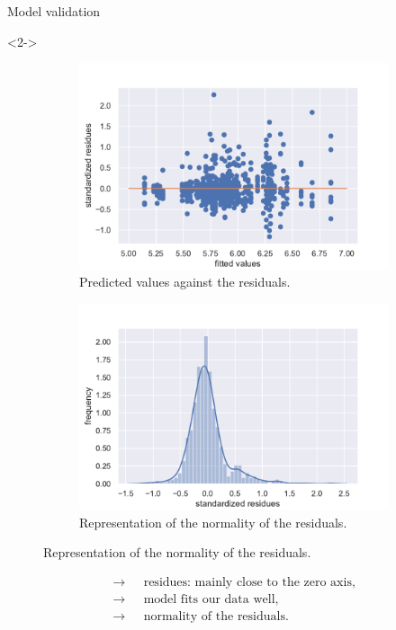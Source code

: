 \documentclass[unknownkeysallowed]{beamer}
\begin{document}
\begin{frame}{Model validation}
\begin{onlyenv}
\begin{figure}[H]
\end{figure}
\end{onlyenv}
\begin{onlyenv}<2->
\begin{figure}[H]
\centering
\begin{subfigure}{.5\textwidth}
  \centering
  \includegraphics[width=1\linewidth]{./images/homo_mod2.pdf}
  \caption{Predicted values against the residuals.}
\end{subfigure}%
\begin{subfigure}{.5\textwidth}
  \centering
  \includegraphics[width=1\linewidth, clip,trim={0cm 0cm 0cm 0cm} ]{./images/resid_norm_m2.pdf}
  \caption{Representation of the normality of the residuals.}
\end{subfigure}
\end{figure}
\begin{align*}
    \longrightarrow \text{ }& \text{residues: mainly close to the zero axis},\\
    \longrightarrow \text{ }& \text{model fits our data well},\\
    \longrightarrow \text{ }& \text{normality of the residuals}.
\end{align*}
\end{onlyenv}
\end{frame}
\end{document}
